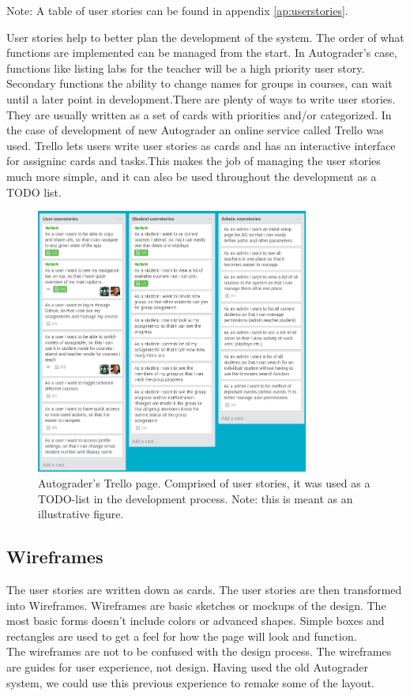 Note: A table of user stories can be found in appendix \ref{ap:userstories}.

User stories help to better plan the development of the system. The order of what functions are implemented can be managed from the start. In Autograder's case, functions like listing labs for the teacher will be a high priority user story. Secondary functions the ability to change names for groups in courses, can wait until a later point in development.There are plenty of ways to write user stories. They are usually written as a set of cards with priorities and/or categorized. In the case of development of new Autograder an online service called Trello was used. Trello lets users write user stories as cards and has an interactive interface for assigninc cards and tasks.This makes the job of managing the user stories much more simple, and it can also be used throughout the development as a TODO list.
\begin{figure}[h]
    \centering
    \includegraphics[width=0.8\textwidth]{./graphics/trello.png}
    \caption{Autograder's Trello page. Comprised of user stories, it was used as a TODO-list in the development process. Note: this is meant as an illustrative figure.}
    \label{fig:View of the trello page we used in the development process}
\end{figure}

\subsection{Wireframes}
The user stories are written down as cards. The user stories are then transformed into Wireframes. Wireframes are basic sketches or mockups of the design. The most basic forms doesn't include colors or advanced shapes. Simple boxes and rectangles are used to get a feel for how the page will look and function.
\\The wireframes are not to be confused with the design process. The wireframes are guides for user experience, not design. Having used the old Autograder system, we could use this previous experience to remake some of the layout. 

